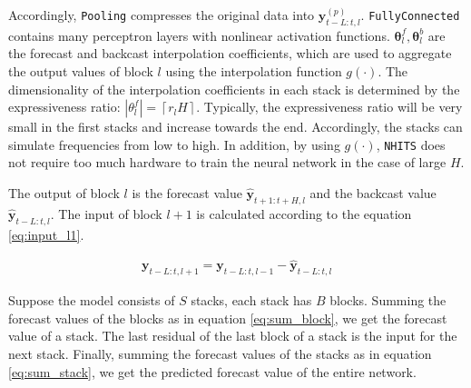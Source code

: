 \documentclass[aps,prb,groupedaddress,twocolumn,showpacs,dvipdfmx,superscriptaddress,pdftex]{revtex4-2}
\begin{document}
Accordingly, \verb|Pooling| compresses the original data into $\mathbf{y}_{t-L:t, l}^{(p)}$. \verb|FullyConnected| contains many perceptron layers with nonlinear activation functions. $\mathbf{\theta}_l^f, \mathbf{\theta}_l^b$ are the forecast and backcast interpolation coefficients, which are used to aggregate the output values of block $l$ using the interpolation function $g(\cdot)$. The dimensionality of the interpolation coefficients in each stack is determined by the expressiveness ratio: $\left| \theta_l^f \right| = \left \lceil r_l H \right \rceil$. Typically, the expressiveness ratio will be very small in the first stacks and increase towards the end. Accordingly, the stacks can simulate frequencies from low to high. In addition, by using $g(\cdot)$, \verb|NHITS| does not require too much hardware to train the neural network in the case of large $H$.

\vspace{2mm}


The output of block $l$ is the forecast value $\mathbf{\hat{y}}_{t+1:t+H, l}$ and the backcast value $\mathbf{\hat{y}}_{t-L:t, l}$. The input of block $l+1$ is calculated according to the equation \ref{eq:input_l1}.

\begin{align}
    \mathbf{y}_{t-L:t, l+1} = \mathbf{y}_{t-L:t, l-1} - \mathbf{\hat{y}}_{t-L:t, l}
    \label{eq:input_l1}
\end{align}


Suppose the model consists of $S$ stacks, each stack has $B$ blocks. Summing the forecast values of the blocks as in equation \ref{eq:sum_block}, we get the forecast value of a stack. The last residual of the last block of a stack is the input for the next stack. Finally, summing the forecast values of the stacks as in equation \ref{eq:sum_stack}, we get the predicted forecast value of the entire network.
\end{document}

